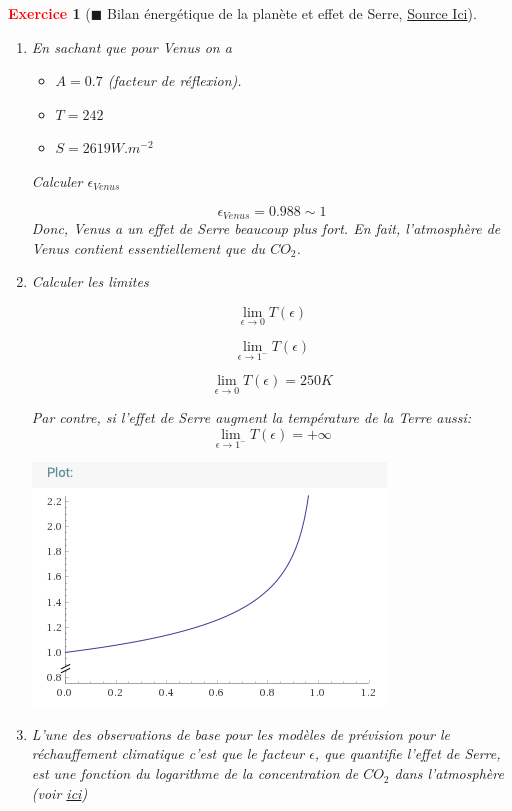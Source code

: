 \documentclass[11pt]{article}
\theoremstyle{mythmstyle}
\newtheorem{exo}{\textcolor{red}{\textbf{Exercice}}}
\begin{document}
\begin{exo}[$\blacksquare$ Bilan énergétique de la planète et effet de Serre, \href{http://step.ipgp.fr/images/e/ec/Bernard_geodynext_td1_corr.pdf}{Source Ici}]
\begin{enumerate}
\item En sachant que pour Venus on a
\begin{itemize}
    \item $A=0.7$ (facteur de réflexion).
    \item $T= 242$
    \item $S= 2619 W.m^{-2}$
\end{itemize}

\noindent Calculer $\epsilon_{Venus}$

\begin{solution}
$$
\epsilon_{Venus}= 0.988 \sim 1
$$
Donc, Venus a un effet de Serre beaucoup plus fort. En fait, l'atmosphère de Venus contient essentiellement que du $CO_2$.
\end{solution}

\item Calculer les limites

$$\lim_{\epsilon\to 0} T(\epsilon)$$

$$\lim_{\epsilon\to 1^{-}} T(\epsilon)$$

\begin{solution}
$$\lim_{\epsilon\to 0} T(\epsilon)= 250 K$$

Par contre, si l'effet de Serre augment la température de la Terre aussi:
$$\lim_{\epsilon\to 1^{-}} T(\epsilon)= +\infty $$

\begin{center}
\includegraphics[scale=0.5]{serre.png}
\end{center}

\end{solution}

\item L'une des observations de base pour les modèles de prévision pour le réchauffement climatique c'est que le facteur $\epsilon$, que quantifie l'effet de Serre, est une fonction du logarithme de la concentration de $CO_2$ dans l'atmosphère (voir \href{https://en.wikipedia.org/wiki/Svante_Arrhenius#Greenhouse_effect}{ici})


\end{enumerate}
\end{exo}
\end{document}
